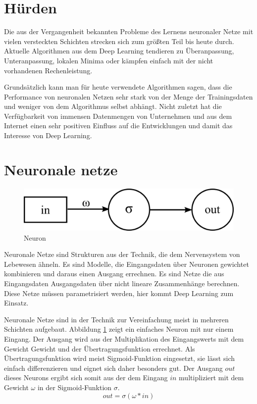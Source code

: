 \section{Hürden}

Die aus der Vergangenheit bekannten Probleme des Lernens neuronaler Netze mit vielen versteckten Schichten strecken sich zum größten Teil bis heute durch. Aktuelle Algorithmen aus dem Deep Learning tendieren zu Überanpassung, Unteranpassung, lokalen Minima oder kämpfen einfach mit der nicht vorhandenen Rechenleistung.

Grundsätzlich kann man für heute verwendete Algorithmen sagen, dass die Performance von neuronalen Netzen sehr stark von der Menge der Trainingsdaten und weniger von dem Algorithmus selbst abhängt. Nicht zuletzt hat die Verfügbarkeit von immensen Datenmengen von Unternehmen und aus dem Internet einen sehr positiven Einfluss auf die Entwicklungen und damit das Interesse von Deep Learning.


\section{Neuronale netze}

\begin{figure}
	\centering
	\includegraphics[scale=1]{images/neuron.png}
	\caption{Neuron}
	\label{fig:neuron}
\end{figure}

Neuronale Netze sind Strukturen aus der Technik, die dem Nervensystem von Lebewesen ähneln. Es sind Modelle, die Eingangsdaten über Neuronen gewichtet kombinieren und daraus einen Ausgang errechnen. Es sind Netze die aus Eingangsdaten Ausgangsdaten über nicht lineare Zusammenhänge berechnen. Diese Netze müssen parametrisiert werden, hier kommt Deep Learning zum Einsatz.

Neuronale Netze sind in der Technik zur Vereinfachung meist in mehreren Schichten aufgebaut. Abbildung \ref{fig:neuron} zeigt ein einfaches Neuron mit nur einem Eingang. Der Ausgang wird aus der Multiplikation des Eingangswerts mit dem Gewicht Gewicht und der Übertragungsfunktion errechnet. Als Übertragungsfunktion wird meist Sigmoid-Funktion eingesetzt, sie lässt sich einfach differenzieren und eignet sich daher besonders gut. Der Ausgang $out$ dieses Neurons ergibt sich somit aus der dem Eingang $in$ multipliziert mit dem Gewicht $\omega$ in der Sigmoid-Funktion $\sigma$.
$$out = \sigma(\omega * in)$$

